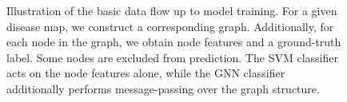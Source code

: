 \documentclass[
	fontsize=10pt, %
	twoside=true, %
	secnumdepth=1, %
  toc=indentunnumbered %
]{kaobook}
\begin{document}

\begin{figure}[h]
  \centering
  \caption{Illustration of the basic data flow up to model training. For a given
    disease map, we construct a corresponding graph. Additionally, for each node
    in the graph, we obtain node features and a ground-truth label. Some nodes are
    excluded from prediction. The SVM classifier acts on the node features alone,
    while the GNN classifier additionally performs message-passing over the graph structure.}
  \label{fig:diag-pipeline}
\end{figure}
\end{document}
